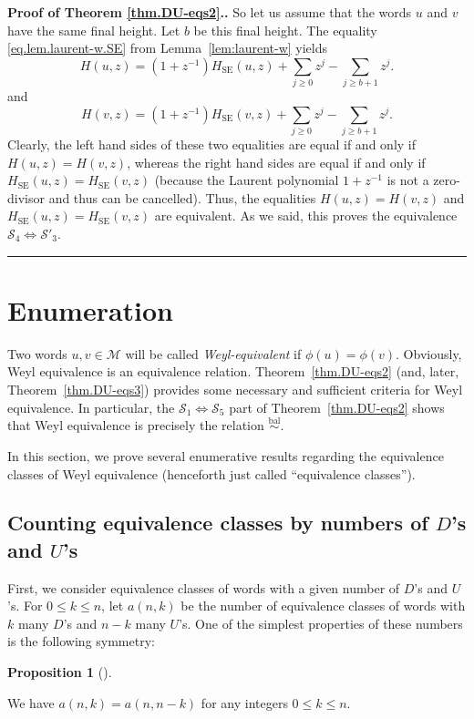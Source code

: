 \documentclass[numbers=enddot,12pt,final,onecolumn,notitlepage]{scrartcl}%
\theoremstyle{definition}
\newtheorem{prop}[theo]{Proposition}
\newenvironment{proposition}[1][]
{\begin{prop}[#1]\begin{leftbar}}
{\end{leftbar}\end{prop}}
\newenvironment{proof}[1][Proof]{\noindent\textbf{#1.} }{\ \rule{0.5em}{0.5em}}
\newcommand{\M}{\mathcal{M}}
\newcommand{\SE}{\operatorname{SE}}
\newcommand{\balsim}{\overset{\operatorname*{bal}}{\sim}}
\newcommand{\tup}[1]{\left( #1 \right)}
\begin{document}
\begin{proof}[Proof of Theorem \ref{thm.DU-eqs2}.]
So let us assume that the words $u$ and $v$ have the same final height.
Let $b$ be this final height.
The equality \eqref{eq.lem.laurent-w.SE} from Lemma~\ref{lem:laurent-w} yields
\[
H(u,z) = (1+z^{-1})H_{\SE}(u,z) + \sum_{j \geq 0} z^j - \sum_{j \geq b+1} z^j.
\]
and
\[
H(v,z) = (1+z^{-1})H_{\SE}(v,z) + \sum_{j \geq 0} z^j - \sum_{j \geq b+1} z^j.
\]
Clearly, the left hand sides of these two equalities are equal
if and only if $H\tup{u, z} = H\tup{v, z}$, whereas the right
hand sides are equal if and only if
$H_{\SE} \tup{u, z} = H_{\SE} \tup{v, z}$ (because the Laurent
polynomial $1 + z^{-1}$ is not a zero-divisor and thus can be cancelled).
Thus, the equalities $H\tup{u, z} = H\tup{v, z}$
and $H_{\SE} \tup{u, z} = H_{\SE} \tup{v, z}$ are equivalent.
As we said, this proves the equivalence
$\mathcal{S}_4 \Longleftrightarrow \mathcal{S}'_3$.
\end{proof}


\section{Enumeration}\label{sec:enum}

Two words $u, v \in \M$ will be called \emph{Weyl-equivalent} if $\phi\tup{u} = \phi\tup{v}$. Obviously, Weyl equivalence is an equivalence relation.
Theorem~\ref{thm.DU-eqs2} (and, later, Theorem~\ref{thm.DU-eqs3}) provides some necessary and sufficient criteria for Weyl equivalence.
In particular, the $\mathcal{S}_1 \Longleftrightarrow \mathcal{S}_5$ part of Theorem~\ref{thm.DU-eqs2} shows that Weyl equivalence is precisely the relation $\balsim$.

In this section, we prove several enumerative results regarding the equivalence classes of Weyl equivalence (henceforth just called ``equivalence classes'').

\subsection{Counting equivalence classes by numbers of $D$'s and $U$'s}

First, we consider equivalence classes of words with a given number of $D$'s and $U$'s. For $0 \leq k \leq n$, let $a(n,k)$ be the number of equivalence classes of words with $k$ many $D$'s and $n-k$ many $U$'s.
One of the simplest properties of these numbers is the following symmetry:

\begin{proposition}
    \label{prop.a.sym}
    We have $a(n, k) = a(n, n-k)$ for any integers $0 \leq k \leq n$.
\end{proposition}
\end{document}
